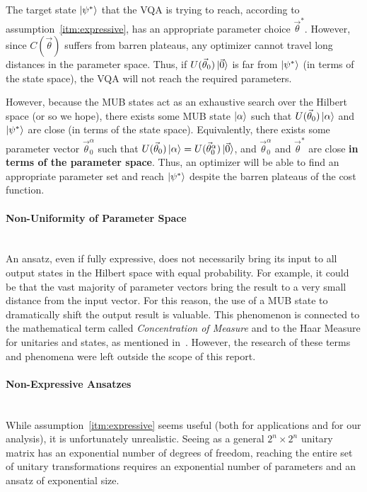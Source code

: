 \documentclass[a4paper,12pt]{article}
\newcommand{\thetas}{\vec{\theta}}
\begin{document}
The target state $\ket{\psi^*}$ that the VQA is trying to reach, according to assumption~\ref{itm:expressive}, has an appropriate parameter choice $\thetas^*$.
However, since $C(\thetas)$ suffers from barren plateaus, any optimizer cannot travel long distances in the parameter space.
Thus, if $U(\thetas_0)\ket{\vec{0}}$ is far from $\ket{\psi^*}$ (in terms of the state space), the VQA will not reach the required parameters.

However, because the MUB states act as an exhaustive search over the Hilbert space (or so we hope), there exists some MUB state $\ket{\alpha}$ such that $U(\thetas_0)\ket{\alpha}$ and $\ket{\psi^*}$ are close (in terms of the state space).
Equivalently, there exists some parameter vector $\thetas_0^\alpha$ such that $U(\thetas_0) \ket{\alpha} = U(\thetas_0^\alpha) \ket{\vec{0}}$, and $\thetas_0^\alpha$ and $\thetas^*$ are close \textbf{in terms of the parameter space}. Thus, an optimizer will be able to find an appropriate parameter set and reach $\ket{\psi^*}$ despite the barren plateaus of the cost function.

\paragraph*{Non-Uniformity of Parameter Space}~\\
An ansatz, even if fully expressive, does not necessarily bring its input to all output states in the Hilbert space with equal probability. For example, it could be that the vast majority of parameter vectors bring the result to a very small distance from the input vector.
For this reason, the use of a MUB state to dramatically shift the output result is valuable.
This phenomenon is connected to the mathematical term called \emph{Concentration of Measure} and to the Haar Measure for unitaries and states, as mentioned in~\cite{mcclean_barren_2018}.
However, the research of these terms and phenomena were left outside the scope of this report.

\paragraph*{Non-Expressive Ansatzes}~\\
While assumption~\ref{itm:expressive} seems useful (both for applications and for our analysis), it is unfortunately unrealistic.
Seeing as a general $2^n \times 2^n$ unitary matrix has an exponential number of degrees of freedom, reaching the entire set of unitary transformations requires an exponential number of parameters and an ansatz of exponential size.
\end{document}
